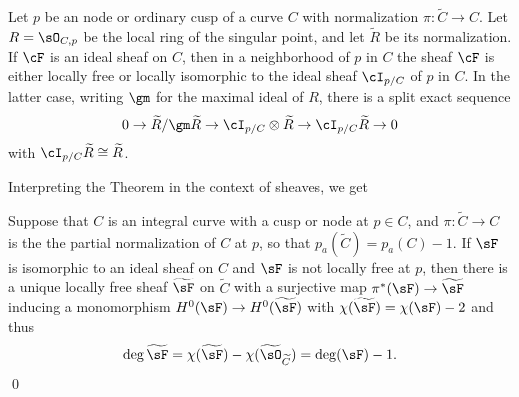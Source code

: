 
\begin{theorem}\label{torsion free at node}
Let $p$ be an node or ordinary cusp of a curve $C$ with normalization $\pi: \widetilde C \to C$. Let $R = \sO_{C,p}$ be the local ring of the singular point,
and let $\widetilde R$ be its normalization.  If $\cF$ is an ideal sheaf on $C$, then in a neighborhood of $p$ in $C$ the sheaf $\cF$ is either locally free or locally isomorphic to the ideal sheaf $\cI_{p/C}$ of $p$ in $C$. In the latter case,
writing $\gm$ for the maximal ideal of $R$,
there is a split exact sequence
$$
0\to \widetilde R/\gm \widetilde R \to \cI_{p/C} \otimes \widetilde R  \to \cI_{p/C} \widetilde R\to 0
$$
with $\cI_{p/C} \widetilde R \cong \widetilde R$.
\end{theorem}

Interpreting the Theorem in the context of sheaves, we get

\begin{corollary}
Suppose that $C$ is an integral curve with a cusp or node at $p\in C$, and $\pi:\widetilde C \to C$ is the
the partial normalization of $C$ at $p$, so that $p_a(\widetilde C) = p_a(C) -1$. If $\sF$ is isomorphic to an ideal sheaf on $C$
and $\sF$ is not locally free at $p$, then there is a unique locally free sheaf $\widetilde \sF$ on $\widetilde C$
with a surjective map $\pi^*(\sF) \to \widetilde\sF$ inducing a monomorphism $H^0(\sF) \to H^0(\widetilde\sF)$
with $\chi(\widetilde \sF) = \chi(\sF) -2$ and thus 
$$
\deg \widetilde \sF = \chi(\widetilde \sF) - \chi(\widetilde \sO_{\widetilde C}) = 
\deg(\sF)-1.
$$
\qed
\end{corollary}

